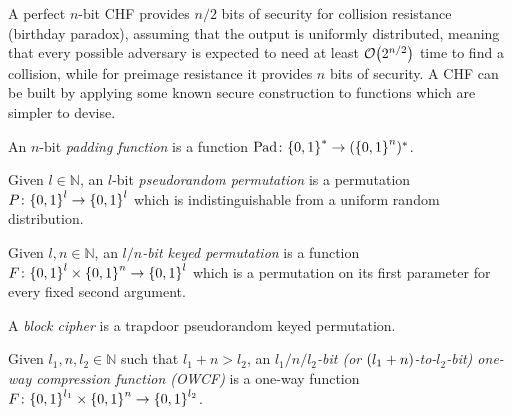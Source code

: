 A perfect \(n\)-bit CHF provides \(n/2\) bits of security for collision resistance 
(birthday paradox), assuming that the output is uniformly distributed, meaning that every possible 
adversary is expected to need at least \(\BigO{2^{n/2}}\) time to find a collision, 
while for preimage resistance it provides \(n\) bits of security.
A CHF can be built by applying some known secure construction to functions which are
simpler to devise.
\begin{definition}
	An \(n\)-bit \emph{padding function} is a function 
	\(\Pad\colon \Set{0, 1}^{*} \to \Parens{\Set{0, 1}^n}^{*}\).
\end{definition}
\begin{definition}
	Given \(l \in \mathbb{N}\), an \(l\)-bit \emph{pseudorandom permutation} is a permutation 
	\(P\colon \Set{0, 1}^l \to \Set{0, 1}^l\) which is indistinguishable from a uniform random 
	distribution.
\end{definition}
\begin{definition}
	Given \(l, n \in \mathbb{N}\), an \emph{\(l/n\)-bit keyed permutation} is
	a function \(F\colon \Set{0, 1}^l \times \Set{0, 1}^n \to \Set{0, 1}^l\) which is a permutation 
  on its first parameter for every fixed second argument.
\end{definition}
\begin{definition}
  A \emph{block cipher} is a trapdoor pseudorandom keyed permutation.
\end{definition}
\begin{definition}
	Given \(l_1, n, l_2 \in \mathbb{N}\) such that \(l_1 + n > l_2\), an 
	\emph{\(l_1/n/l_2\)-bit (or \(\Parens*{l_1+n}\)-to-\(l_2\)-bit) one-way compression function (OWCF)} 
	is a one-way function \(F\colon \Set{0, 1}^{l_1} \times \Set{0, 1}^{n} \to \Set{0, 1}^{l_2}\).
\end{definition}

